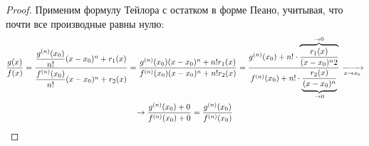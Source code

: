 \begin{proof}
	Применим формулу Тейлора с остатком в форме Пеано, учитывая, что почти все производные равны нулю:
	\begin{multline*}
		\frac{g(x)}{f(x)} = \frac{\dfrac{g^{(n)}(x_0)}{n!}(x - x_0)^n + r_1(x)}{\dfrac{f^{(n)}(x_0)}{n!}(x - x_0)^n + r_2(x)} = \frac{g^{(n)}(x_0)(x - x_0)^n + n!r_1(x)}{f^{(n)}(x_0)(x - x_0)^n + n!r_2(x)} = \frac{g^{(n)}(x_0) + n! \cdot  \overbrace{\dfrac{r_1(x)}{(x - x_0)^n2}}^{\to 0}}{f^{(n)}(x_0) + n! \cdot \underbrace{\dfrac{r_2(x)}{(x - x_0)^n}}_{\to 0}} \xrightarrow[x \to x_0]{} \\ \to \frac{g^{(n)}(x_0) + 0}{f^{(n)}(x_0) + 0} = \frac{g^{(n)}(x_0)}{f^{(n)}(x_0)}
	\end{multline*}
\end{proof}
